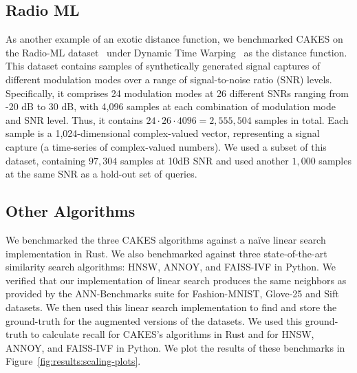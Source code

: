 \subsection{Radio ML}
\label{sec:datasets-and-benchmarks:radio-ml}

As another example of an exotic distance function, we benchmarked CAKES on the Radio-ML dataset~\cite{oshea2018radioml} under Dynamic Time Warping~\cite{muller2007dynamic} as the distance function.
This dataset contains samples of synthetically generated signal captures of different modulation modes over a range of signal-to-noise ratio (SNR) levels.
Specifically, it comprises 24 modulation modes at 26 different SNRs ranging from -20 dB to 30 dB, with 4,096 samples at each combination of modulation mode and SNR level.
Thus, it contains $24 \cdot 26 \cdot 4096 = 2,555,504$ samples in total.
Each sample is a 1,024-dimensional complex-valued vector, representing a signal capture (a time-series of complex-valued numbers).
We used a subset of this dataset, containing $97,304$ samples at 10dB SNR and used another $1,000$ samples at the same SNR as a hold-out set of queries.


\subsection{Other Algorithms}
\label{sec:datasets-and-benchmarks:other-algorithms}

We benchmarked the three CAKES algorithms against a na\"ive linear search implementation in Rust.
We also benchmarked against three state-of-the-art similarity search algorithms: HNSW, ANNOY, and FAISS-IVF in Python.
We verified that our implementation of linear search produces the same neighbors as provided by the ANN-Benchmarks suite for Fashion-MNIST, Glove-25 and Sift datasets.
We then used this linear search implementation to find and store the ground-truth for the augmented versions of the datasets.
We used this ground-truth to calculate recall for CAKES's algorithms in Rust and for HNSW, ANNOY, and FAISS-IVF in Python.
We plot the results of these benchmarks in Figure~\ref{fig:results:scaling-plots}.

